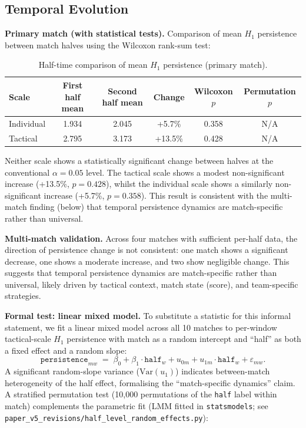 \subsection{Temporal Evolution}
\label{sec:temporal}

\textbf{Primary match (with statistical tests).} Comparison of mean \(H_1\) persistence between match halves using the Wilcoxon rank-sum test:

\begin{table}[H]
  \centering
  \caption{Half-time comparison of mean \(H_1\) persistence (primary match).}
  \label{tab:temporal}
  \begin{tabular}{@{}lccccc@{}}
      \toprule
      Scale & First half mean & Second half mean & Change & Wilcoxon \(p\) & Permutation \(p\) \\
      \midrule
      Individual & 1.934 & 2.045 & +5.7\%  & 0.358 & N/A \\
      Tactical   & 2.795 & 3.173 & +13.5\% & 0.428 & N/A \\
      \bottomrule
  \end{tabular}
\end{table}

Neither scale shows a statistically significant change between halves at the conventional $\alpha=0.05$ level. The tactical scale shows a modest non-significant increase (+13.5\%, \(p=0.428\)), whilst the individual scale shows a similarly non-significant increase (+5.7\%, \(p=0.358\)). This result is consistent with the multi-match finding (below) that temporal persistence dynamics are match-specific rather than universal.

\textbf{Multi-match validation.} Across four matches with sufficient per-half data, the direction of persistence change is not consistent: one match shows a significant decrease, one shows a moderate increase, and two show negligible change. This suggests that temporal persistence dynamics are match-specific rather than universal, likely driven by tactical context, match state (score), and team-specific strategies.

\textbf{Formal test: linear mixed model.} To substitute a statistic for this informal statement, we fit a linear mixed model across all 10 matches to per-window tactical-scale \(H_1\) persistence with match as a random intercept and ``half'' as both a fixed effect and a random slope:
\[
  \mathtt{persistence}_{mw} \;=\; \beta_0 + \beta_1 \cdot \mathtt{half}_{w} + u_{0m} + u_{1m}\cdot\mathtt{half}_{w} + \varepsilon_{mw}.
\]
A significant random-slope variance (\(\mathrm{Var}(u_1)\)) indicates between-match heterogeneity of the half effect, formalising the ``match-specific dynamics'' claim. A stratified permutation test (10{,}000 permutations of the \texttt{half} label within match) complements the parametric fit (LMM fitted in \texttt{statsmodels}; see \texttt{paper\_v5\_revisions/half\_level\_random\_effects.py}):

